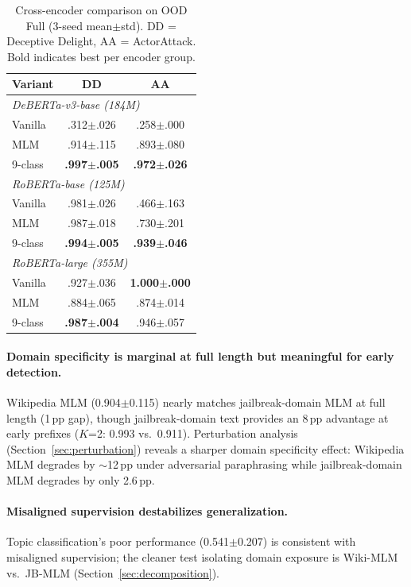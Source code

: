 \begin{table}[t]
\centering
\footnotesize
\caption{Cross-encoder comparison on OOD Full (3-seed mean$\pm$std). DD = Deceptive Delight, AA = ActorAttack. Bold indicates best per encoder group.}
\label{tab:cross_encoder}
\begin{tabular}{@{}lcc@{}}
\toprule
\textbf{Variant} & DD & AA \\
\midrule
\multicolumn{3}{l}{\textit{DeBERTa-v3-base (184M)}} \\[2pt]
Vanilla & .312$\pm$.026 & .258$\pm$.000 \\
MLM & .914$\pm$.115 & .893$\pm$.080 \\
9-class & \textbf{.997$\pm$.005} & \textbf{.972$\pm$.026} \\
\midrule
\multicolumn{3}{l}{\textit{RoBERTa-base (125M)}} \\[2pt]
Vanilla & .981$\pm$.026 & .466$\pm$.163 \\
MLM & .987$\pm$.018 & .730$\pm$.201 \\
9-class & \textbf{.994$\pm$.005} & \textbf{.939$\pm$.046} \\
\midrule
\multicolumn{3}{l}{\textit{RoBERTa-large (355M)}} \\[2pt]
Vanilla & .927$\pm$.036 & \textbf{1.000$\pm$.000} \\
MLM & .884$\pm$.065 & .874$\pm$.014 \\
9-class & \textbf{.987$\pm$.004} & .946$\pm$.057 \\
\bottomrule
\end{tabular}
\end{table}

\paragraph{Domain specificity is marginal at full length but meaningful for early detection.}
Wikipedia MLM (0.904$\pm$0.115) nearly matches jailbreak-domain MLM at full length (1\,pp gap), though jailbreak-domain text provides an 8\,pp advantage at early prefixes ($K$=2: 0.993 vs.\ 0.911).
Perturbation analysis (Section~\ref{sec:perturbation}) reveals a sharper domain specificity effect: Wikipedia MLM degrades by $\sim$12\,pp under adversarial paraphrasing while jailbreak-domain MLM degrades by only 2.6\,pp.

\paragraph{Misaligned supervision destabilizes generalization.}
Topic classification's poor performance (0.541$\pm$0.207) is consistent with misaligned supervision; the cleaner test isolating domain exposure is Wiki-MLM vs.\ JB-MLM (Section~\ref{sec:decomposition}).

